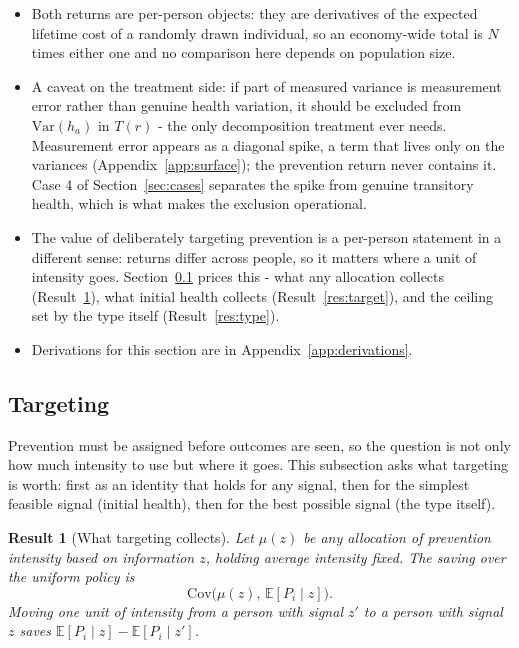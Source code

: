 \documentclass[11pt]{article}
\newtheorem{result}{Result}
\theoremstyle{remark}
\newcommand{\E}{\mathbb{E}}
\newcommand{\Var}{\mathrm{Var}}
\newcommand{\Cov}{\mathrm{Cov}}
\begin{document}
\begin{itemize}
\item Both returns are per-person objects: they are derivatives of the expected lifetime cost of a randomly drawn individual, so an economy-wide total is $N$ times either one and no comparison here depends on population size.
\item A caveat on the treatment side: if part of measured variance is measurement error rather than genuine health variation, it should be excluded from $\Var(h_a)$ in $T(r)$ - the only decomposition treatment ever needs.
Measurement error appears as a diagonal spike, a term that lives only on the variances (Appendix~\ref{app:surface}); the prevention return never contains it.
Case 4 of Section~\ref{sec:cases} separates the spike from genuine transitory health, which is what makes the exclusion operational.
\item The value of deliberately targeting prevention is a per-person statement in a different sense: returns differ across people, so it matters where a unit of intensity goes.
Section~\ref{sec:target0} prices this - what any allocation collects (Result~\ref{res:collect}), what initial health collects (Result~\ref{res:target}), and the ceiling set by the type itself (Result~\ref{res:type}).
\item Derivations for this section are in Appendix~\ref{app:derivations}.
\end{itemize}

\subsection{Targeting}\label{sec:target0}

Prevention must be assigned before outcomes are seen, so the question is not only how much intensity to use but where it goes.
This subsection asks what targeting is worth: first as an identity that holds for any signal, then for the simplest feasible signal (initial health), then for the best possible signal (the type itself).

\begin{result}[What targeting collects]\label{res:collect}
Let $\mu(z)$ be any allocation of prevention intensity based on information $z$, holding average intensity fixed. The saving over the uniform policy is
\begin{equation}
\Cov\bigl(\mu(z),\,\E[P_i\mid z]\bigr).
\label{eq:collect}
\end{equation}
Moving one unit of intensity from a person with signal $z'$ to a person with signal $z$ saves $\E[P_i\mid z]-\E[P_i\mid z']$.
\end{result}
\end{document}
